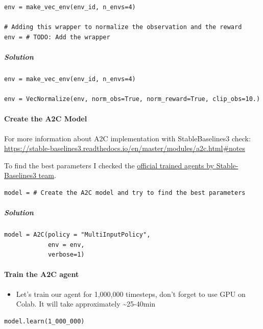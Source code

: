 \documentclass[11pt,a4paper]{article}
\begin{document}
\begin{lstlisting}
env = make_vec_env(env_id, n_envs=4)

# Adding this wrapper to normalize the observation and the reward
env = # TODO: Add the wrapper
\end{lstlisting}

\subparagraph{Solution}\label{solution}

\begin{lstlisting}
env = make_vec_env(env_id, n_envs=4)

env = VecNormalize(env, norm_obs=True, norm_reward=True, clip_obs=10.)
\end{lstlisting}

\paragraph{Create the A2C Model}\label{create-the-a2c-model}

For more information about A2C implementation with StableBaselines3 check: \url{https://stable-baselines3.readthedocs.io/en/master/modules/a2c.html#notes}

To find the best parameters I checked the \href{https://huggingface.co/sb3}{official trained agents by Stable-Baselines3 team}.

\begin{lstlisting}
model = # Create the A2C model and try to find the best parameters
\end{lstlisting}

\subparagraph{Solution}\label{solution-1}

\begin{lstlisting}
model = A2C(policy = "MultiInputPolicy",
            env = env,
            verbose=1)
\end{lstlisting}

\paragraph{Train the A2C agent}\label{train-the-a2c-agent}

\begin{itemize}
\tightlist
\item
  Let's train our agent for 1,000,000 timesteps, don't forget to use GPU on Colab. It will take approximately \textasciitilde25-40min
\end{itemize}

\begin{lstlisting}
model.learn(1_000_000)
\end{lstlisting}
\end{document}
